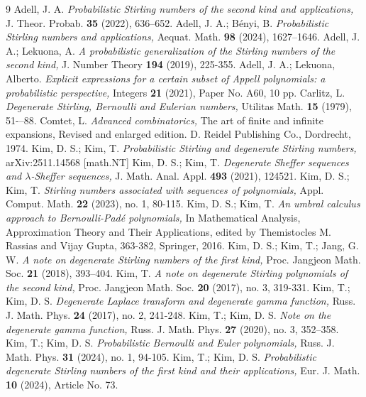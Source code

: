 \documentclass[a4paper,11pt]{amsart}
\begin{document}
\begin{thebibliography}{9} 
Adell, J. A. \emph{Probabilistic Stirling numbers of the second kind and applications,} J. Theor. Probab. \textbf{35} (2022), 636–652. 
Adell, J. A.; B{\'e}nyi, B. \emph{Probabilistic Stirling numbers and applications,} Aequat. Math. \textbf{98} (2024), 1627–1646.
Adell, J. A.; Lekuona, A. \emph{A probabilistic generalization of the Stirling numbers of the second kind,} J. Number Theory \textbf{194} (2019), 225-355.
Adell, J. A.; Lekuona, Alberto. \emph{Explicit expressions for a certain subset of Appell polynomials: a probabilistic perspective,} Integers \textbf{21} (2021), Paper No. A60, 10 pp.
Carlitz, L. \emph{Degenerate Stirling, Bernoulli and Eulerian numbers,} Utilitas Math. \textbf{15} (1979), 51-–88.
Comtet, L. \emph{Advanced combinatorics,} The art of finite and infinite expansions, Revised and enlarged edition. D. Reidel Publishing Co., Dordrecht, 1974.
Kim, D. S.; Kim, T. \emph{Probabilistic Stirling and degenerate Stirling numbers,} arXiv:2511.14568 [math.NT]
Kim, D. S.; Kim, T. \emph{Degenerate Sheffer sequences and $\lambda$-Sheffer sequences,} J. Math. Anal. Appl. \textbf{493} (2021), 124521.
Kim, D. S.; Kim, T. \emph{Stirling numbers associated with sequences of polynomials,} Appl. Comput. Math. \textbf{22} (2023), no. 1, 80-115.
Kim, D. S.; Kim, T. \emph{An umbral calculus approach to Bernoulli-Pad\'e polynomials,} In Mathematical Analysis, Approximation Theory and Their Applications, edited by Themistocles M. Rassias and Vijay Gupta, 363-382, Springer, 2016.
Kim, D. S.; Kim, T.; Jang, G. W. \emph{A note on degenerate Stirling numbers of the first kind,} Proc. Jangjeon Math. Soc. \textbf{21} (2018), 393–404.
Kim, T. \emph{A note on degenerate Stirling polynomials of the second kind,} Proc. Jangjeon Math. Soc. \textbf{20}  (2017),  no. 3, 319-331.
Kim, T.; Kim, D. S. \emph{Degenerate Laplace transform and degenerate gamma function,} Russ. J. Math. Phys. \textbf{24} (2017), no. 2, 241-248.
Kim, T.; Kim, D. S. \emph{Note on the degenerate gamma function,} Russ. J. Math. Phys. \textbf{27} (2020), no. 3, 352–358.
Kim, T.; Kim, D. S. \emph{Probabilistic Bernoulli and Euler polynomials,} Russ. J. Math. Phys. \textbf{31} (2024), no. 1, 94-105.
Kim, T.; Kim, D. S. \emph{Probabilistic degenerate Stirling numbers of the first kind and their applications,} Eur. J. Math. \textbf{10} (2024), Article No. 73.

\end{thebibliography}
\end{document}
